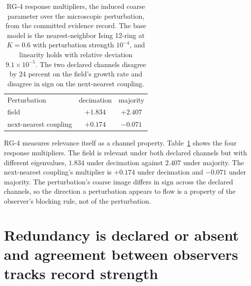 \documentclass[aps,pre,reprint,nofootinbib,floatfix]{revtex4-2}
\begin{document}
\begin{table}[t]
\caption{RG-4 response multipliers, the induced coarse parameter
over the microscopic perturbation, from the committed evidence
record.  The base model is the nearest-neighbor Ising 12-ring at
$K=0.6$ with perturbation strength $10^{-4}$, and linearity holds
with relative deviation $9.1\times10^{-5}$.  The two declared
channels disagree by 24 percent on the field's growth rate and
disagree in sign on the next-nearest coupling.}
\label{tab:rg4}
\begin{ruledtabular}
\begin{tabular}{lcc}
Perturbation & decimation & majority \\
\colrule
field                 & $+1.834$ & $+2.407$ \\
next-nearest coupling & $+0.174$ & $-0.071$ \\
\end{tabular}
\end{ruledtabular}
\end{table}

RG-4 measures relevance itself as a channel property.
Table~\ref{tab:rg4} shows the four response multipliers.  The field
is relevant under both declared channels but with different
eigenvalues, $1.834$ under decimation against $2.407$ under
majority.  The next-nearest coupling's multiplier is $+0.174$ under
decimation and $-0.071$ under majority.  The perturbation's coarse
image differs in sign across the declared channels, so the
direction a perturbation appears to flow is a property of the
observer's blocking rule, not of the perturbation.

\section{Redundancy is declared or absent and agreement between
observers tracks record strength}
\label{sec:qd}
\end{document}
